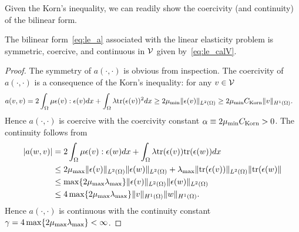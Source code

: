 Given the Korn's inequality, we can readily show the coercivity (and continuity) of the bilinear form.

\begin{proposition}
  \label{prop:le_lm_a}
  The bilinear form~\eqref{eq:le_a} associated with the linear elasticity problem is symmetric, coercive, and continuous in $\mathcal{V}$ given by~\eqref{eq:le_calV}.
  \begin{proof}
    The symmetry of $a(\cdot,\cdot)$ is obvious from inspection. The coercivity of $a(\cdot,\cdot)$ is a consequence of the Korn's inequality: for any $v \in \mathcal{V}$
    \begin{align*}
      a(v,v)
      &= 2 \int_{\Omega} \mu \epsilon(v) : \epsilon(v) dx
      + \int_\Omega  \lambda \text{tr}(\epsilon(v))^2 dx
      \geq 2 \mu_{\rm min} \| \epsilon(v) \|_{L^2(\Omega)}
      \geq 2 \mu_{\rm min} C_{\rm Korn} \| v \|_{H^1(\Omega)}.
    \end{align*}
    Hence $a(\cdot,\cdot)$ is coercive with the coercivity constant $\alpha \equiv 2 \mu_{\rm min} C_{\rm Korn} > 0$. The continuity follows from
    \begin{align*}
      |a(w,v)|
      &= 2 \int_{\Omega} \mu \epsilon(v) : \epsilon(w) dx
      + \int_\Omega  \lambda \text{tr}(\epsilon(v))\text{tr}(\epsilon(w)) dx
      \\
      &\leq 2 \mu_{\rm max} \| \epsilon(v) \|_{L^2(\Omega)} \| \epsilon(w) \|_{L^2(\Omega)}
      + \lambda_{\rm max} \| \text{tr}(\epsilon(v)) \|_{L^2(\Omega)} \| \text{tr}(\epsilon(w) \|
      \\
      &\leq \max \{ 2\mu_{\rm max} \lambda_{\rm max} \} \| \epsilon(v) \|_{L^2(\Omega)} \| \epsilon(w) \|_{L^2(\Omega)}
      \\
      &\leq 4 \max \{ 2\mu_{\rm max} \lambda_{\rm max} \} \| v \|_{H^1(\Omega)} \| w \|_{H^1(\Omega)}.
    \end{align*}
    Hence $a(\cdot,\cdot)$ is continuous with the continuity constant $\gamma = 4 \max \{ 2\mu_{\rm max} \lambda_{\rm max} \} < \infty$.
  \end{proof}
\end{proposition}
